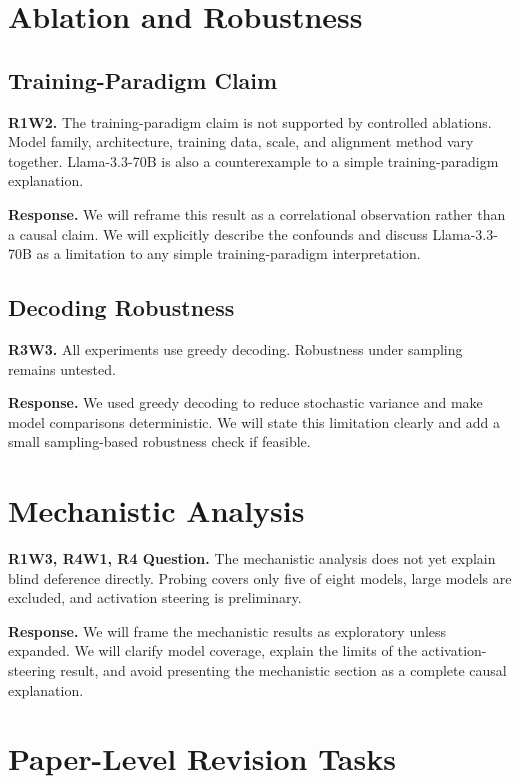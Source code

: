 \documentclass[11pt]{article}
\begin{document}
\section{Ablation and Robustness}

\subsection{Training-Paradigm Claim}

\noindent
\textbf{R1W2.}
The training-paradigm claim is not supported by controlled ablations. Model family, architecture, training data, scale, and alignment method vary together. Llama-3.3-70B is also a counterexample to a simple training-paradigm explanation.

\noindent
\textbf{Response.}
We will reframe this result as a correlational observation rather than a causal claim. We will explicitly describe the confounds and discuss Llama-3.3-70B as a limitation to any simple training-paradigm interpretation.

\subsection{Decoding Robustness}

\noindent
\textbf{R3W3.}
All experiments use greedy decoding. Robustness under sampling remains untested.

\noindent
\textbf{Response.}
We used greedy decoding to reduce stochastic variance and make model comparisons deterministic. We will state this limitation clearly and add a small sampling-based robustness check if feasible.

\section{Mechanistic Analysis}

\noindent
\textbf{R1W3, R4W1, R4 Question.}
The mechanistic analysis does not yet explain blind deference directly. Probing covers only five of eight models, large models are excluded, and activation steering is preliminary.

\noindent
\textbf{Response.}
We will frame the mechanistic results as exploratory unless expanded. We will clarify model coverage, explain the limits of the activation-steering result, and avoid presenting the mechanistic section as a complete causal explanation.

\section{Paper-Level Revision Tasks}
\end{document}

